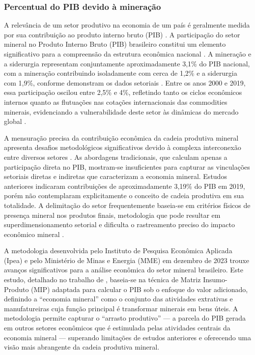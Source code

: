 \subsubsection{Percentual do PIB devido à mineração}
\label{subsubsec:percentual_pib}

A relevância de um setor produtivo na economia de um país é geralmente medida por sua contribuição ao produto interno bruto (PIB) \cite{leao2023}. A participação do setor mineral no Produto Interno Bruto (PIB) brasileiro constitui um elemento significativo para a compreensão da estrutura econômica nacional \cite{leao2023}. A mineração e a siderurgia representam conjuntamente aproximadamente 3,1\% do PIB nacional, com a mineração contribuindo isoladamente com cerca de 1,2\% e a siderurgia com 1,9\%, conforme demonstram os dados setoriais \cite{apc2024}. Entre os anos 2000 e 2019, essa participação oscilou entre 2,5\% e 4\%, refletindo tanto os ciclos econômicos internos quanto as flutuações nas cotações internacionais das commodities minerais, evidenciando a vulnerabilidade deste setor às dinâmicas do mercado global \cite{leao2023,ipea2023,apc2024}.

A mensuração precisa da contribuição econômica da cadeia produtiva mineral apresenta desafios metodológicos significativos devido à complexa interconexão entre diversos setores \cite{leao2023,ipea2023}. As abordagens tradicionais, que calculam apenas a participação direta no PIB, mostram-se insuficientes para capturar as vinculações setoriais diretas e indiretas que caracterizam a economia mineral. Estudos anteriores indicaram contribuições de aproximadamente 3,19\% do PIB em 2019, porém não contemplaram explicitamente o conceito de cadeia produtiva em sua totalidade. A delimitação do setor frequentemente baseia-se em critérios físicos de presença mineral nos produtos finais, metodologia que pode resultar em superdimensionamento setorial e dificulta o rastreamento preciso do impacto econômico mineral \cite{leao2023}.

A metodologia desenvolvida pelo Instituto de Pesquisa Econômica Aplicada (Ipea) e pelo Ministério de Minas e Energia (MME) em dezembro de 2023 trouxe avanços significativos para a análise econômica do setor mineral brasileiro. Este estudo, detalhado no trabalho de , baseia-se na técnica de Matriz Insumo-Produto (MIP) adaptada para calcular o PIB sob o enfoque do valor adicionado, definindo a ``economia mineral'' como o conjunto das atividades extrativas e manufatureiras cuja função principal é transformar minerais em bens úteis. A metodologia permite capturar o ``arrasto produtivo'' --- a parcela do PIB gerada em outros setores econômicos que é estimulada pelas atividades centrais da economia mineral --- superando limitações de estudos anteriores e oferecendo uma visão mais abrangente da cadeia produtiva mineral.


